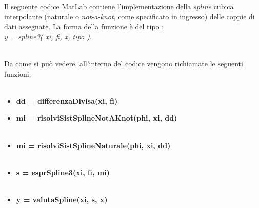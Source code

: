 Il seguente codice MatLab contiene l'implementazione della \textit{spline} cubica interpolante (naturale o \textit{not-a-knot}, come specificato in ingresso) delle coppie di dati assegnate. La forma della funzione è del tipo :\\ \textit{y = spline3( xi, fi, x, tipo )}.\\\
	
Da come si può vedere, all'interno del codice vengono richiamate le seguenti funzioni:\\\ 
	\begin{itemize}
		\item \textbf{dd = differenzaDivisa(xi, fi)}
	    	
		\item \textbf{mi = risolviSistSplineNotAKnot(phi, xi, dd)}\\\
	    	
		\item \textbf{mi = risolviSistSplineNaturale(phi, xi, dd)}\\\
	      	
		\item \textbf{s = esprSpline3(xi, fi, mi)}\\\
	    	
		\item \textbf{y = valutaSpline(xi, s, x)}\\\
	      	
	\end{itemize}